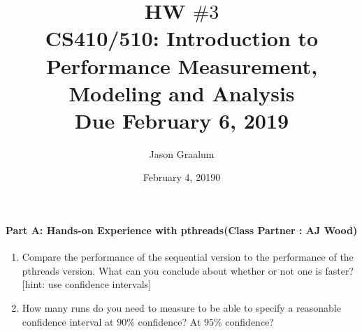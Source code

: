 \documentclass[11pt]{article}
\title{\bf HW $\#3$ \\[2ex]
\rm\normalsize CS410/510: Introduction to Performance Measurement, Modeling and Analysis \\ Due February 6, 2019}
\date{February 4, 20190}
\author{Jason Graalum}
\begin{document}
\maketitle

\paragraph{Part A: Hands-on Experience with pthreads(Class Partner : AJ Wood)} 
\begin{enumerate}[(1)]
\item Compare the performance of the sequential version to the performance of the pthreads version. What can you conclude about whether or not one is faster? $[$hint: use confidence intervals$]$\\
\item How many runs do you need to measure to be able to specify a reasonable confidence interval at $90\%$ confidence? At $95\%$ confidence?\\
\end{enumerate}
\end{document}
